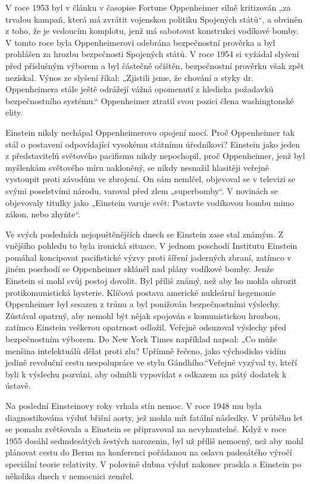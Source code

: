   V roce 1953 byl v článku v časopise Fortune Oppenheimer silně kritizován „za trvalou kampaň, která
  má zvrátit vojenskou politiku Spojených států“, a obviněn z toho, že je vedoucím komplotu, jenž má
  sabotovat konstrukci vodíkové bomby. V tomto roce byla Oppenheimerovi odebrána bezpečnostní
  prověrka a byl prohlášen za hrozbu bezpečnosti Spojených států. V roce 1954 si vyžádal slyšení
  před příslušným výborem a byl částečně očištěn, bezpečnostní prověrku však zpět nezískal. Výnos ze
  slyšení říkal: „Zjistili jsme, že chování a styky dr. Oppenheimera stále ještě odrážejí vážná
  opomenutí z hlediska požadavků bezpečnostního systému.“ Oppenheimer ztratil svou pozici člena
  washingtonské elity. 
  
  Einstein nikdy nechápal Oppenheimerovo opojení mocí. Proč Oppenheimer tak stál o postavení
  odpovídající vysokému státnímu úředníkovi? Einstein jako jeden z představitelů světového pacifismu
  nikdy nepochopil, proč Oppenheimer, jenž byl myšlenkám světového míru nakloněný, se nikdy nesnažil
  hlasitěji veřejně vystoupit proti závodům ve zbrojení. On sám nemlčel, objevoval se v televizi se
  svými poselstvími národu, varoval před zlem „superbomby“. V novinách se objevovaly titulky jako
  „Einstein varuje svět: Postavte vodíkovou bombu mimo zákon, nebo zhyňte“. 
  
  Ve svých posledních nejopuštěnějších dnech se Einstein zase stal známým. Z vnějšího pohledu to
  byla ironická situace. V jednom poschodí Institutu Einstein pomáhal koncipovat pacifistické výzvy
  proti šíření jaderných zbraní, zatímco v jiném poschodí se Oppenheimer skláněl nad plány vodíkové
  bomby. Jenže Einstein si mohl svůj postoj dovolit. Byl příliš známý, než aby ho mohla ohrozit
  protikomunistická hysterie. Klíčová postava americké nukleární hegemonie Oppenheimer byl sesazen z
  trůnu a byl ponižován bezpečnostními výslechy. Zůstával opatrný, aby nemohl být nějak spojován s
  komunistickou hrozbou, zatímco Einstein veškerou opatrnost odložil. Veřejně odsuzoval výslechy
  před bezpečnostním výborem. Do New York Times například napsal: „Co může menšina intelektuálů
  dělat proti zlu? Upřímně řečeno, jako východisko vidím jedině revoluční cestu nespolupráce ve
  stylu Gándhího.“Veřejně vyzýval ty, kteří byli k výslechu pozváni, aby odmítli vypovídat s odkazem
  na pátý dodatek k ústavě. 
  
  Na poslední Einsteinovy roky vrhala stín nemoc. V roce 1948 mu byla diagnostikována výduť břišní
  aorty, jež mohla mít fatální následky. V průběhu let se pomalu zvětšovala a Einstein se
  připravoval na nevyhnutelné. Když v roce 1955 dosáhl sedmdesátých šestých narozenin, byl už příliš
  nemocný, než aby mohl plánovat cestu do Bernu na konferenci pořádanou na oslavu padesátého výročí
  speciální teorie relativity. V polovině dubna výduť nakonec praskla a Einstein po několika dnech v
  nemocnici zemřel. 
  
